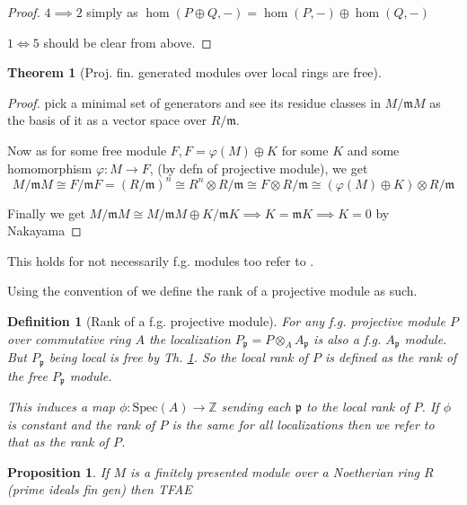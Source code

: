\documentclass[12pt]{article}
\numberwithin{equation}{section}
\newcommand{\Z}{\mathbb{Z}}
\newcounter{dummy} \numberwithin{dummy}{section}
\newtheorem{theorem}[dummy]{Theorem}
\newtheorem{definition}[dummy]{Definition}
\newtheorem{proposition}[dummy]{Proposition}
\begin{document}
\begin{appendices}
\begin{proof}
		$4 \implies 2$ simply as $\hom (P \oplus Q,-) = \hom(P,-) \oplus \hom(Q,-)$
		
		$1 \iff 5$ should be clear from above.
		
	\end{proof}
	
	\begin{theorem}[Proj. fin. generated modules over local rings are free]\label{a2}
	\end{theorem}
	\begin{proof}
		pick a minimal set of generators and see its residue classes in $M/\mathfrak{m}M$ as the basis of it as a vector space over $R/\mathfrak{m}$.
		
		Now as for some free module $F, F=\varphi(M)\oplus K$ for some $K$ and some homomorphism $\varphi: M \to F$, (by defn of projective module), 	we get \[ M/\mathfrak{m}M \cong 	F/\mathfrak{m}F = (R/\mathfrak{m})^n\cong R^n\otimes R/\mathfrak{m} \cong F \otimes R/\mathfrak{m} \cong (\varphi(M)\oplus K) \otimes R/\mathfrak{m}\]
		
		Finally we get $M/\mathfrak{m}M \cong M/\mathfrak{m}M \oplus K/\mathfrak{m}K\implies K=\mathfrak{m}K \implies K=0$ by Nakayama
	\end{proof}
	This holds for not necessarily f.g. modules too refer to \cite[Th.~2.5]{matsumura_1987}	.
	
		Using the convention of \cite{lam1999lectures} we define the rank of a projective module as such.
	\begin{definition}[Rank of a f.g. projective module]\label{def:rankproj}
		For any f.g. projective module $P$ over commutative ring $A$ the localization $P_\mathfrak{p} =P \otimes_A A_\mathfrak{p}$ is also a f.g. $A_\mathfrak{p}$ module. But $P_\mathfrak{p}$ being local is free by Th. \ref{a2}. So the local rank of $P$ is defined as the rank of the free $P_\mathfrak{p} $ module.
		
		This induces a map $\phi: \mathrm{Spec}(A) \to \Z $ sending each $\mathfrak{p}$ to the local rank of $P$. If $\phi $ is constant and the rank of $P$ is the same for all localizations then we refer to that as the rank of $P$.
	\end{definition}
	
	\begin{proposition} If $M$ is a finitely presented module over a Noetherian ring $R$ (prime ideals fin gen) then TFAE
		

\end{proposition}
\end{appendices}
\end{document}
